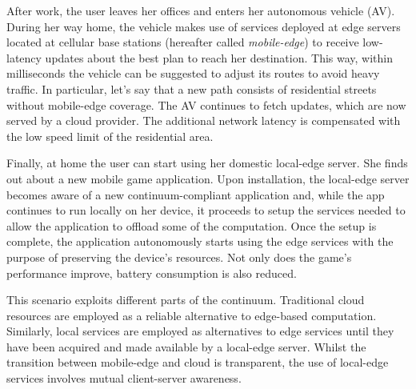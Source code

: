 After work, the user leaves her offices and enters her autonomous vehicle (AV). During her way home, the vehicle makes use of services deployed at edge servers located at cellular base stations (hereafter called \textit{mobile-edge}) to receive low-latency updates about the best plan to reach her destination. This way, within milliseconds the vehicle can be suggested to adjust its routes to avoid heavy traffic. In particular, let's say that a new path consists of residential streets without mobile-edge coverage. The AV continues to fetch updates, which are now served by a cloud provider. The additional network latency is compensated with the low speed limit of the residential area.

Finally, at home the user can start using her domestic local-edge server. She finds out about a new mobile game application. Upon installation, the local-edge server becomes aware of a new continuum-compliant application and, while the app continues to run locally on her device, it proceeds to setup the services needed to allow the application to offload some of the computation. Once the setup is complete, the application autonomously starts using the edge services with the purpose of preserving the device's resources. Not only does the game's performance improve, battery consumption is also reduced.  

This scenario exploits different parts of the continuum. Traditional cloud resources are employed as a reliable alternative to edge-based computation. Similarly, local services are employed as alternatives to edge services until they have been acquired and made available by a local-edge server. Whilst the transition between mobile-edge and cloud is transparent, the use of local-edge services involves mutual client-server awareness.

